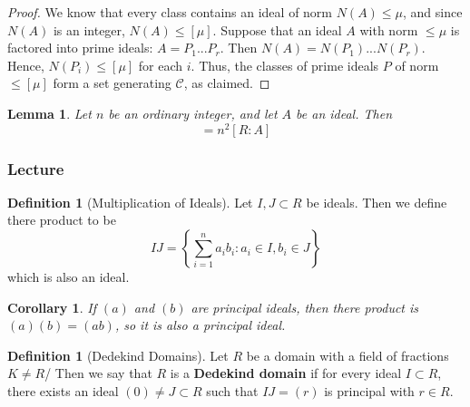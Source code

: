 \documentclass[12pt]{article}
\newtheorem{lem}[thm]{Lemma}  %
\newtheorem{cor}[thm]{Corollary}
\theoremstyle{definition}
\newtheorem{defn}[thm]{Definition}
\theoremstyle{remark}
\numberwithin{equation}{section}
\newcommand\B[1]{\textbf{ #1}}
\begin{document}
\begin{proof}
        We know that every class contains an ideal of norm $N(A) \leq \mu$, and since $N(A)$ is an integer, $N(A) \leq [\mu]$. Suppose that an ideal $A$ with norm $\leq \mu$ is factored into prime ideals: $A = P_1...P_r$. Then $N(A) = N(P_1)...N(P_r)$. Hence, $N(P_i) \leq [\mu]$ for each $i$. Thus, the classes of prime ideals $P$ of norm $\leq [\mu]$ form a set generating $\mathcal{C}$, as claimed.
\end{proof}

\vspace{15pt}

\begin{lem}
        Let $n$ be an ordinary integer, and let $A$ be an ideal. Then \begin{equation}
                [R:nA] = n^2[R:A]
        \end{equation}
\end{lem}

\vspace{15pt}

\subsubsection{Lecture}

\begin{defn}[Multiplication of Ideals]
        Let $I,J \subset R$ be ideals. Then we define there product to be \begin{equation}
                IJ = \left\{\sum_{i=1}^na_ib_i:a_i \in I,b_i \in J\right\}
        \end{equation}
        which is also an ideal.
\end{defn}


\vspace{15pt}

\begin{cor}
        If $(a)$ and $(b)$ are principal ideals, then there product is $(a)(b) = (ab)$, so it is also a principal ideal.
\end{cor}

\vspace{15pt}


\begin{defn}[Dedekind Domains]
        Let $R$ be a domain with a field of fractions $K \neq R$/ Then we say that $R$ is a \B{Dedekind domain} if for every ideal $I\subset R$, there exists an ideal $(0)\neq J \subset R$ such that $IJ = (r)$ is principal with $r \in R$.
\end{defn}
\end{document}
